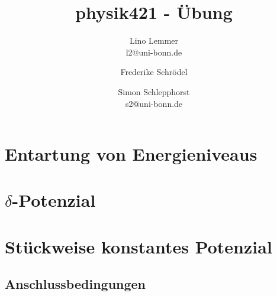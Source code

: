 

\setcounter{thezettel}{2}
\renewcommand\thesection{\arabic{thezettel}.\arabic{section}}

\title{physik421 - Übung }
\author{Lino Lemmer \\ \small{l2@uni-bonn.de} \and Frederike Schrödel \and Simon Schlepphorst\\ 
 \small{s2@uni-bonn.de}}


\maketitle

\section{Entartung von Energieniveaus}

\section{$\delta$-Potenzial}

\section{Stückweise konstantes Potenzial}

\subsection{Anschlussbedingungen}

